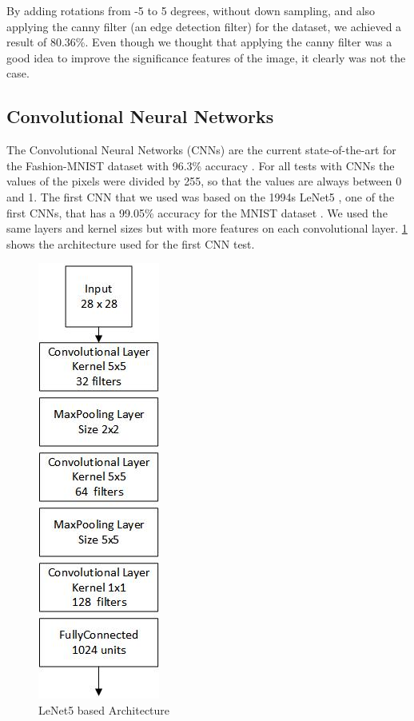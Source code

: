 \documentclass[twoside,twocolumn]{article}
\begin{document}
By adding rotations from -5 to 5 degrees, without down sampling, and also applying the canny filter (an edge detection filter)
for the dataset, we achieved a result of 80.36\%. Even though we thought that applying the canny filter was a good idea to improve
the significance features of the image, it clearly was not the case.

\subsection{Convolutional Neural Networks}

     The Convolutional Neural Networks (CNNs) are the current state-of-the-art for the Fashion-MNIST dataset with 96.3\% accuracy \cite{randomerasingdataaugmentationpaper}. For all tests with CNNs the values of the pixels were divided by 255, so that the values are always between 0 and 1. The first CNN that we used was based on the 1994s LeNet5 \cite{yannLeCun:1998}, one of the first CNNs, that has a 99.05\% accuracy for the MNIST dataset \cite{yannLeCun:mnist}. We used the same layers and kernel sizes but with more features on each convolutional layer. \ref{fig:lenet5} shows the architecture used for the first CNN test.

    \begin{figure}[h]
    \begin{center}
        \includegraphics[scale=0.8]{lenet5Arch.jpg}
        \caption{LeNet5 based Architecture\label{fig:lenet5}}
    \end{center}
    \end{figure}
    
\end{document}
